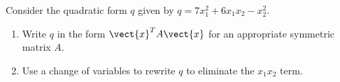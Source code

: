 \begin{enumialphparenastyle}
\begin{ex} Consider the quadratic form $q$ given by $q = 7x_1^2 + 6x_1x_2 - x_2^2$.
\begin{enumerate}
\item Write $q$ in the form $\vect{x}^TA\vect{x}$ for an appropriate symmetric matrix $A$.
\item Use a change of variables to rewrite $q$ to eliminate the $x_1x_2$ term. 
\end{enumerate}
\end{ex}

\end{enumialphparenastyle}